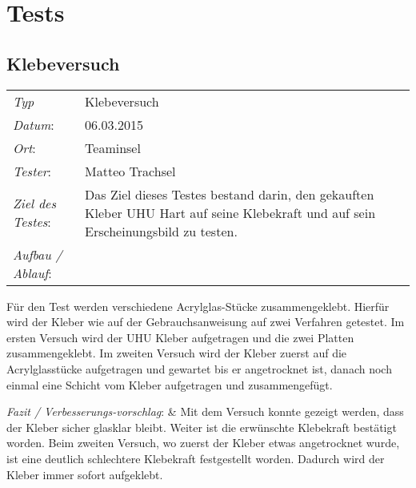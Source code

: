 \section{Tests}
\subsection{Klebeversuch}
\begin{tabular}{p{3.6cm}p{\textwidth-3.6cm-0.7cm}}
\rule{0pt}{11pt}\textit{Typ}              & Klebeversuch \\ 
\rule{0pt}{11pt}\textit{Datum}:           & 06.03.2015   \\
\rule{0pt}{11pt}\textit{Ort}:             & Teaminsel \\
\rule{0pt}{11pt}\textit{Tester}:          & Matteo Trachsel \\
\rule{0pt}{11pt}\textit{Ziel des Testes}: & Das Ziel dieses Testes bestand darin, den gekauften Kleber UHU Hart auf seine Klebekraft und auf sein Erscheinungsbild zu testen. \\
\rule{0pt}{11pt}\textit{Aufbau / Ablauf}: & 
\end{tabular}
Für den Test werden verschiedene Acrylglas-Stücke zusammengeklebt.
Hierfür wird der Kleber wie auf der Gebrauchsanweisung auf zwei Verfahren getestet. Im ersten Versuch wird der UHU Kleber aufgetragen und die zwei Platten zusammengeklebt. Im zweiten Versuch wird der Kleber zuerst auf die Acrylglasstücke aufgetragen und gewartet bis er angetrocknet ist, danach noch einmal eine Schicht vom Kleber aufgetragen und zusammengefügt.\\
\rule{0pt}{11pt}\textit{Fazit / Verbesserungs-\newline vorschlag}: & 
Mit dem Versuch konnte gezeigt werden, dass der Kleber sicher glasklar bleibt. Weiter ist die erwünschte Klebekraft bestätigt worden. Beim zweiten Versuch, wo zuerst der Kleber etwas angetrocknet wurde, ist eine deutlich schlechtere Klebekraft festgestellt worden. Dadurch wird der Kleber immer sofort aufgeklebt.\\